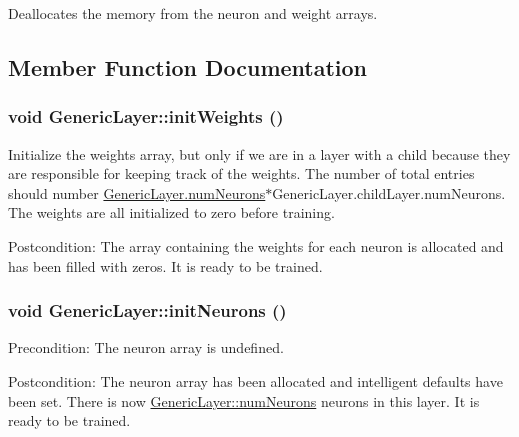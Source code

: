 Deallocates the memory from the neuron and weight arrays. 

\subsection{Member Function Documentation}
\hypertarget{classGenericLayer_2e2e170339c48bbcfe05afe9a1f60e43}{
\subsubsection[initWeights]{\setlength{\rightskip}{0pt plus 5cm}void Generic\-Layer::init\-Weights ()}}
\label{classGenericLayer_2e2e170339c48bbcfe05afe9a1f60e43}


Initialize the weights array, but only if we are in a layer with a child because they are responsible for keeping track of the weights. The number of total entries should number \hyperlink{classGenericLayer_7b45631903aa50e67fe5a1947fc292bd}{Generic\-Layer.num\-Neurons}$\ast$Generic\-Layer.child\-Layer.num\-Neurons. The weights are all initialized to zero before training. \begin{Desc}
\item[Postcondition:]The array containing the weights for each neuron is allocated and has been filled with zeros. It is ready to be trained. \end{Desc}
\hypertarget{classGenericLayer_c9357145e80d180b812df7bddeb5139d}{
\subsubsection[initNeurons]{\setlength{\rightskip}{0pt plus 5cm}void Generic\-Layer::init\-Neurons ()}}
\label{classGenericLayer_c9357145e80d180b812df7bddeb5139d}


\begin{Desc}
\item[Precondition:]The neuron array is undefined. \end{Desc}
\begin{Desc}
\item[Postcondition:]The neuron array has been allocated and intelligent defaults have been set. There is now \hyperlink{classGenericLayer_7b45631903aa50e67fe5a1947fc292bd}{Generic\-Layer::num\-Neurons} neurons in this layer. It is ready to be trained. \end{Desc}


